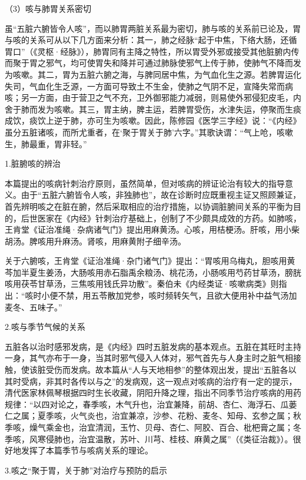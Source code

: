 \documentclass[draft,12pt]{ctexbook}
\begin{document}
（3）咳与肺胃关系密切

虽“五脏六腑皆令人咳”，而以肺胃两脏关系最为密切，肺与咳的关系前已论及，胃与咳的关系可从以下几方面来分析：其一，肺之经脉“起于中焦，下络大肠，还循胃口”（《灵枢·经脉》），肺胃同有主降之特性，所以胃受外邪或接受其他脏腑内传而聚于胃之邪气，均可使胃失和降并可通过肺脉使邪气上传于肺，使肺气不降而发为咳嗽。其二，胃为五脏六腑之海，与脾同居中焦，为气血化生之源。若脾胃运化失司，气血化生乏源，一方面可导致土不生金，使肺之气阴不足，宣降失常而病咳；另一方面，由于营卫之气不充，卫外御邪能力减弱，则易使外邪侵犯皮毛，内舍于肺而发为咳嗽。其三，胃主纳，脾主运，若脾胃受伤，水津失运，停聚而生痰成饮，痰饮上逆于肺，亦可生为咳嗽。因此，陈修园《医学三字经》说：“《内经》虽分五脏诸咳，而所尤重者，在‘聚于胃关于肺’六字。”其歌诀谓：“气上呛，咳嗽生，肺最重，胃非轻。”


1.脏腑咳的辨治

本篇提出的咳病针刺治疗原则，虽然简单，但对咳病的辨证论治有较大的指导意义。由于“五脏六腑皆令人咳，非独肺也”，故在诊断时应既重视主证又照顾兼证，首先辨明咳之在脏在腑，然后采取相应的治疗措施，以协调脏腑间关系的平衡为目的，后世医家在《内经》针刺治疗基础上，创制了不少颇具成效的方药。如肺咳，王肯堂《证治准绳·杂病诸气门》提出用麻黄汤。心咳，用桔梗汤。肝咳，用小柴胡汤。脾咳用升麻汤。肾咳，用麻黄附子细辛汤。

关于六腑咳，王肯堂《证治准绳·杂门诸气门》提出：“胃咳用乌梅丸，胆咳用黄芩加半夏生姜汤，大肠咳用赤石脂禹余粮汤、桃花汤，小肠咳用芍药甘草汤，膀胱咳用茯苓甘草汤，三焦咳用钱氏异功散”。秦伯未《内经类证·咳嗽病类》则指出：“咳时小便不禁，用五苓散加党参，咳时频转矢气，且欲大便用补中益气汤加麦冬、五味子。”

2.咳与季节气候的关系

五脏各以治时感邪发病，是《内经》四时五脏发病的基本观点。五脏在其旺时主持一身，其气亦布于一身，当其时邪气侵入人体对，邪气首先与人身主时之脏气相接触，使该脏受伤而发病。故本篇从“人与天地相参”的整体观出发，提出“五脏各以其时受病，非其时各传以与之”的发病观，这一观点对咳病的治疗有一定的提示，清代医家林佩琴根据四时生长收藏，阴阳升降之理，指出不同季节治疗咳病的用药规律：“以四对论之，春季咳，木气升也，治宜兼降，前胡、杏仁、海浮石、瓜蒌仁之属；夏季咳，火气炎也，治宜兼凉，沙参、花粉、麦冬、知母、玄参之属；秋季咳，燥气乘金也，治宜清润，玉竹、贝母、杏仁、阿胶、百合、枇杷膏之属；冬季咳，风寒侵肺也，治宜温散，苏叶、川芎、桂枝、麻黄之属”（《类征治裁》）。很好地发挥了本篇季节与咳病关系的理论。

3.咳之“聚于胃，关于肺”对治疗与预防的启示
\end{document}
